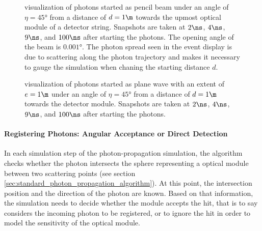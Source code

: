\begin{figure}[htbp]
  \hfill
  \hfill
  \hfill
  \caption{ visualization of photons started as pencil beam under an angle of $\eta = \ang{45}$ from a distance of $d = 1\m$ towards the upmost optical module of a detector string. Snapshots are taken at $2\ns$, $4\ns$, $9\ns$, and $100\ns$ after starting the photons. The opening angle of the beam is $\ang{0.001}$. The photon spread seen in the event display is due to scattering along the photon trajectory and makes it necessary to gauge the simulation when chaning the starting distance $d$.}
  \label{fig:Paihah7h}
\end{figure}

\begin{figure}[htbp]
  \hfill
  \hfill
  \hfill
  \caption{ visualization of photons started as plane wave with an extent of $e = 1\m$ under an angle of $\eta = \ang{45}$ from a distance of $d = 1\m$ towards the detector module. Snapshots are taken at $2\ns$, $4\ns$, $9\ns$, and $100\ns$ after starting the photons.}
  \label{fig:Aehi7kae}
\end{figure}


\paragraph{Registering Photons: Angular Acceptance or Direct Detection}
In each simulation step of the photon-propagation simulation, the algorithm checks whether the photon intersects the sphere representing a optical module between two scattering points (see section \ref{sec:standard_photon_propagation_algorithm}). At this point, the intersection position and the direction of the photon are known. Based on that information, the simulation needs to decide whether the module accepts the hit, that is to say considers the incoming photon to be registered, or to ignore the hit in order to model the sensitivity of the optical module.

